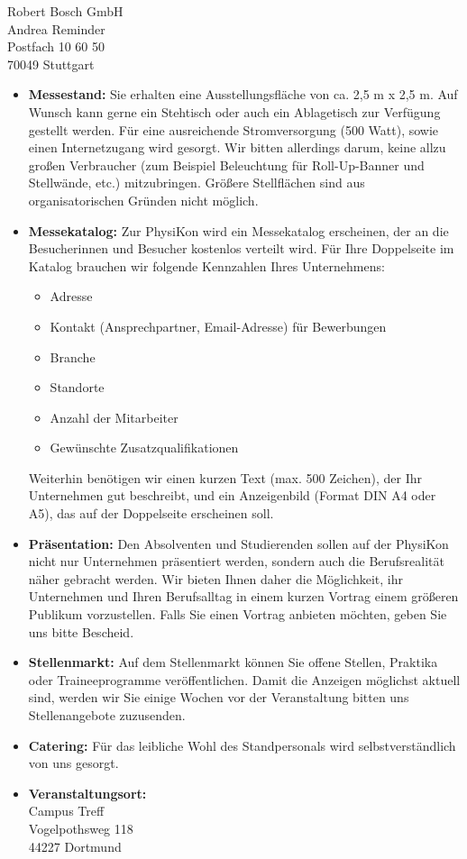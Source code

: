 \documentclass[
  pepbrief,
  fontsize=12pt,
  paper=a4,
  DIV=14,
  parskip=half,
  backaddress=false,
]{scrlttr2}
\begin{document}
\begin{letter}{%
  Robert Bosch GmbH\\
  Andrea Reminder\\
  Postfach 10 60 50\\
  70049 Stuttgart

}
\begin{itemize}
  \item \textbf{Messestand:} Sie erhalten eine Ausstellungsfläche von ca. 2,5 m x 2,5 m.
    Auf Wunsch kann gerne ein Stehtisch oder auch ein Ablagetisch zur Verfügung gestellt werden.
    Für eine ausreichende Stromversorgung (500 Watt), sowie einen Internetzugang wird gesorgt.
    Wir bitten allerdings darum, keine allzu großen Verbraucher (zum Beispiel Beleuchtung für Roll-Up-Banner und Stellwände, etc.) mitzubringen.
    Größere Stellflächen sind aus organisatorischen Gründen nicht möglich.
    \item \textbf{Messekatalog:} Zur PhysiKon wird ein Messekatalog erscheinen, der an die Besucherinnen und Besucher kostenlos verteilt wird.
    Für Ihre Doppelseite im Katalog brauchen wir folgende Kennzahlen Ihres Unternehmens:
    \begin{itemize}
      \item Adresse
      \item Kontakt (Ansprechpartner, Email-Adresse) für Bewerbungen
      \item Branche
      \item Standorte
      \item Anzahl der Mitarbeiter
      \item Gewünschte Zusatzqualifikationen
    \end{itemize}
    Weiterhin benötigen wir einen kurzen Text (max. 500 Zeichen), der Ihr Unternehmen gut beschreibt, und ein Anzeigenbild (Format DIN A4 oder A5), das auf der Doppelseite erscheinen soll.
    \item \textbf{Präsentation:} Den Absolventen und Studierenden sollen auf der PhysiKon nicht nur Unternehmen präsentiert werden, sondern auch die Berufsrealität näher gebracht werden.
    Wir bieten Ihnen daher die Möglichkeit, ihr Unternehmen und Ihren Berufsalltag in einem kurzen Vortrag einem größeren Publikum vorzustellen.
    Falls Sie einen Vortrag anbieten möchten, geben Sie uns bitte Bescheid.
    \item \textbf{Stellenmarkt:} Auf dem Stellenmarkt können Sie offene Stellen, Praktika oder Traineeprogramme veröffentlichen. Damit die Anzeigen möglichst aktuell sind,
    werden wir Sie einige Wochen vor der Veranstaltung bitten uns Stellenangebote zuzusenden.
    \item \textbf{Catering:} Für das leibliche Wohl des Standpersonals wird selbstverständlich von uns gesorgt.
    \item \textbf{Veranstaltungsort:}
    \vspace{3mm}\\
    Campus Treff\\
    Vogelpothsweg 118\\
    44227 Dortmund
\end{itemize}


\end{letter}
\end{document}
